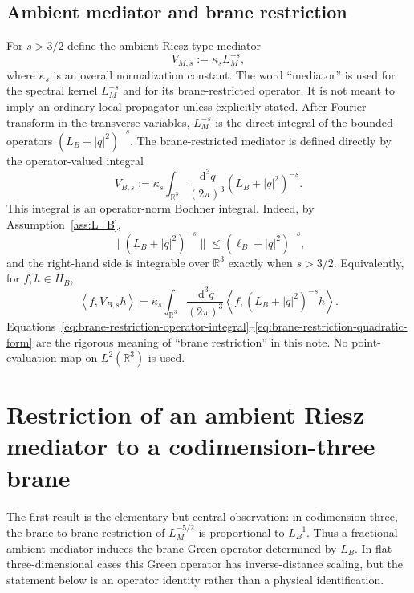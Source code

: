\documentclass[11pt]{article}
\newcommand{\R}{\mathbb{R}}
\newcommand{\dd}{\,\mathrm{d}}
\newcommand{\braket}[2]{\left\langle #1,#2\right\rangle}
\begin{document}
\subsection{Ambient mediator and brane restriction}

For $s>3/2$ define the ambient Riesz-type mediator
\[
    V_{M,s}:=\kappa_s L_M^{-s},
\]
where $\kappa_s$ is an overall normalization constant.  The word ``mediator'' is used for the spectral kernel $L_M^{-s}$ and for its brane-restricted operator.  It is not meant to imply an ordinary local propagator unless explicitly stated.  After Fourier transform in the transverse variables, $L_M^{-s}$ is the direct integral of the bounded operators $(L_B+|q|^2)^{-s}$.  The brane-restricted mediator is defined directly by the operator-valued integral
\begin{equation}
    V_{B,s}
    :=\kappa_s\int_{\R^3}\frac{\dd^3q}{(2\pi)^3}
      (L_B+|q|^2)^{-s}.
    \label{eq:brane-restriction-operator-integral}
\end{equation}
This integral is an operator-norm Bochner integral.  Indeed, by Assumption~\ref{ass:L_B},
\[
    \bigl\|(L_B+|q|^2)^{-s}\bigr\|
    \leq (\ell_B+|q|^2)^{-s},
\]
and the right-hand side is integrable over $\R^3$ exactly when $s>3/2$.  Equivalently, for $f,h\in H_B$,
\begin{equation}
    \braket{f}{V_{B,s}h}
    =\kappa_s\int_{\R^3}\frac{\dd^3q}{(2\pi)^3}
      \braket{f}{(L_B+|q|^2)^{-s}h}.
    \label{eq:brane-restriction-quadratic-form}
\end{equation}
Equations~\eqref{eq:brane-restriction-operator-integral}--\eqref{eq:brane-restriction-quadratic-form} are the rigorous meaning of ``brane restriction'' in this note.  No point-evaluation map on $L^2(\R^3)$ is used.

\section{Restriction of an ambient Riesz mediator to a codimension-three brane}
\label{sec:brane-restriction}

The first result is the elementary but central observation: in codimension three, the brane-to-brane restriction of $L_M^{-5/2}$ is proportional to $L_B^{-1}$.  Thus a fractional ambient mediator induces the brane Green operator determined by $L_B$.  In flat three-dimensional cases this Green operator has inverse-distance scaling, but the statement below is an operator identity rather than a physical identification.
\end{document}

